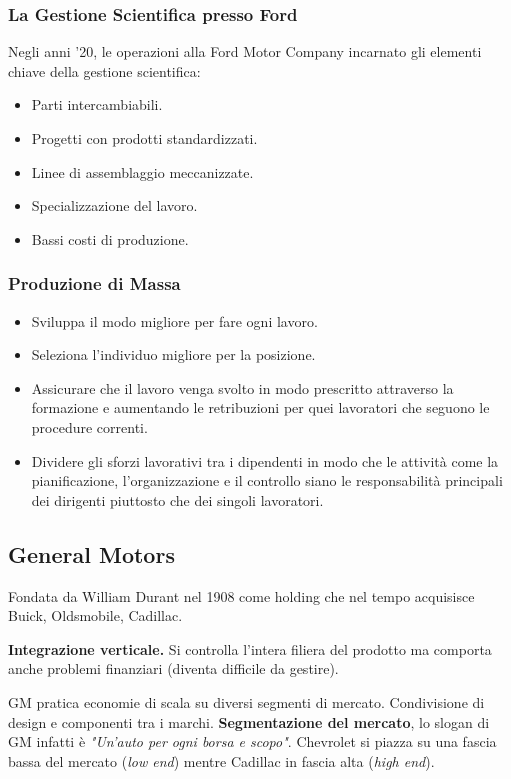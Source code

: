 \documentclass[a4paper,portrait,12pt]{article}
\theoremstyle{definition}
\begin{document}
\subsubsection{La Gestione Scientifica presso Ford}
Negli anni '20, le operazioni alla Ford Motor Company incarnato gli elementi chiave della gestione scientifica:
\begin{itemize}
\item Parti intercambiabili.
\item Progetti con prodotti standardizzati.
\item Linee di assemblaggio meccanizzate.
\item Specializzazione del lavoro.
\item Bassi costi di produzione.
\end{itemize}

\subsubsection{Produzione di Massa}
\begin{itemize}
\item Sviluppa il modo migliore per fare ogni lavoro.
\item Seleziona l'individuo migliore per la posizione.
\item Assicurare che il lavoro venga svolto in modo prescritto attraverso la formazione e aumentando le retribuzioni per quei lavoratori che seguono le procedure correnti.
\item Dividere gli sforzi lavorativi tra i dipendenti in modo che le attività come la pianificazione, l'organizzazione e il controllo siano le responsabilità principali dei dirigenti piuttosto che dei singoli lavoratori.
\end{itemize}

\subsection{General Motors}

Fondata da William Durant nel 1908 come holding che nel tempo acquisisce Buick, Oldsmobile, Cadillac.

\textbf{Integrazione verticale.} Si controlla l'intera filiera del prodotto ma comporta anche problemi finanziari (diventa difficile da gestire).

GM pratica economie di scala su diversi segmenti di mercato.
Condivisione di design e componenti tra i marchi.
\textbf{Segmentazione del mercato}, lo slogan di GM infatti è
\emph{"Un'auto per ogni borsa e scopo"}.
Chevrolet si piazza su una fascia bassa del mercato (\emph{low end}) mentre Cadillac in fascia alta (\emph{high end}).
\end{document}
